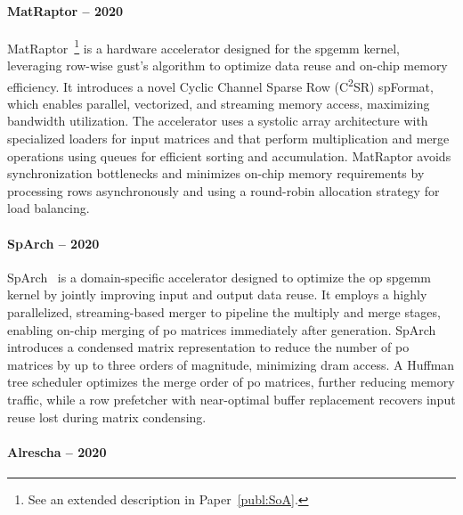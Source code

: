 \paragraph{MatRaptor -- 2020}

MatRaptor~\cite{Srivastava2020_MatRaptor}\footnote{\label{fn:extended_description}See an extended description in Paper~\ref{publ:SoA}.} is a hardware accelerator designed for the \acrshort{spgemm} kernel, leveraging row-wise \acrlong{gust}'s algorithm to optimize data reuse and on-chip memory efficiency.
It introduces a novel Cyclic Channel Sparse Row (C\textsuperscript{2}SR) \gls{spFormat}, which enables parallel, vectorized, and streaming memory access, maximizing bandwidth utilization.
The accelerator uses a systolic array architecture with specialized loaders for input matrices and  that perform multiplication and merge operations using queues for efficient sorting and accumulation.
MatRaptor avoids synchronization bottlenecks and minimizes on-chip memory requirements by processing rows asynchronously and using a round-robin allocation strategy for load balancing.

\paragraph{SpArch -- 2020}

SpArch~\cite{Zhekai2020_SpArch} is a domain-specific accelerator designed to optimize the \acrlong{op} \acrshort{spgemm} kernel by jointly improving input and output data reuse.
It employs a highly parallelized, streaming-based merger to pipeline the multiply and merge stages, enabling on-chip merging of \acrlong{po} matrices immediately after generation.
SpArch introduces a condensed matrix representation to reduce the number of \acrlong{po} matrices by up to three orders of magnitude, minimizing \acrshort{dram} access.
A Huffman tree scheduler optimizes the merge order of \acrlong{po} matrices, further reducing memory traffic, while a row prefetcher with near-optimal buffer replacement recovers input reuse lost during matrix condensing.

\paragraph{Alrescha -- 2020}


